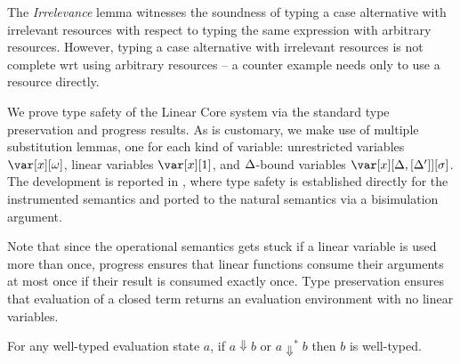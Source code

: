 \documentclass[acmsmall,review,screen]{acmart}
\begin{document}
\WHNFConvSoundness

The \emph{Irrelevance} lemma witnesses the soundness of typing a
case alternative with irrelevant resources with respect to
typing the same expression with arbitrary resources. However, typing
a case alternative with irrelevant resources is not complete wrt using
arbitrary resources -- a counter example needs only to use a resource
directly.


We prove type safety of the Linear Core system via the standard type
preservation and progress results. As is customary, we make use of multiple
substitution lemmas, one for each kind of variable: unrestricted variables
$\xo$, linear variables $\xl$, and $\Delta$-bound variables $\xD$. The
development is reported in \cite{techreport}, where type safety is established directly for the
instrumented semantics and ported to the natural semantics via a
bisimulation argument.

Note that since the operational semantics gets stuck if a linear
variable is used more than once, progress ensures that linear
functions consume their arguments at most once if their result is
consumed exactly once. Type preservation ensures that evaluation of a
closed term returns an evaluation environment with no linear variables.

  \begin{theorem}
    For any well-typed evaluation state $a$, if $a \Downarrow
    b$ or $a \Downarrow^* b$ then $b$ is well-typed.
  \end{theorem}
\end{document}
